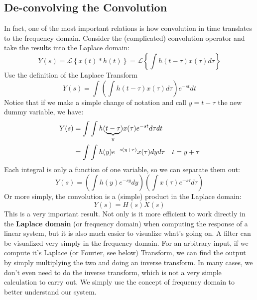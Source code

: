 \subsection{De-convolving the Convolution}
In fact, one of the most important relations is how convolution in time translates to the frequency domain.  Consider the (complicated) convolution operator and take the results into the Laplace domain:
    \begin{equation}
        Y(s) = \mathcal{L} \left\{ x(t) * h(t) \right\} = \mathcal{L} \left\{  \int h(t-\tau) x(\tau) d\tau \right\} 
    \end{equation}
Use the definition of the Laplace Transform
    \begin{equation}
        Y(s) = \int \left( \int h(t-\tau) x(\tau) d\tau \right) e^{-s t} dt
    \end{equation}
Notice that if we make a simple change of notation and call $y = t-\tau$ the new dummy variable, we have:
    \begin{align*}
        Y(s) &= \int \int h(\underbrace{t-\tau}_{y}) x(\tau) e^{-s t} d\tau dt\\
        &= \int \int h(y) e^{-s(y + \tau)} x(\tau) dy d\tau &\text{\emph{$t = y + \tau$}}
    \end{align*}
Each integral is only a function of one variable, so we can separate them out:
    \begin{equation}
        Y(s) = \left( \int h(y) e^{-sy} dy \right) \left( \int x(\tau) e^{-s \tau} d\tau \right)
    \end{equation}
 Or more simply, the convolution is a (simple) product in the Laplace domain:
    \begin{equation}
        Y(s) = H(s) X(s) 
    \end{equation}
This is a very important result.  Not only is it more efficient to work directly in the \textbf{Laplace domain} (or frequency domain) when computing the response of a linear system, but it is also much easier to visualize what's going on.  A filter can be visualized very simply in the frequency domain. For an arbitrary input, if we compute it's Laplace (or Fourier, see below) Transform, we can find the output by simply multiplying the two and doing an inverse transform.  In many cases, we don't even need to do the inverse transform, which is not a very simple calculation to carry out.  We simply use the concept of frequency domain to better understand our system.
